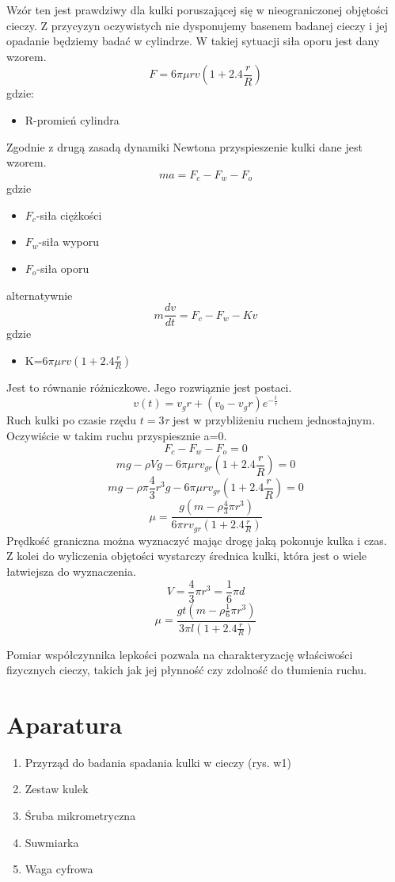 \documentclass{article}
\begin{document}
\vspace{0.5cm}
Wzór ten jest prawdziwy dla kulki poruszającej się w nieograniczonej objętości cieczy. Z przycyzyn oczywistych nie dysponujemy basenem badanej cieczy i jej opadanie będziemy badać w cylindrze. W takiej sytuacji siła oporu jest dany wzorem.
\[F=6\pi\mu rv(1+2.4\frac{r}{R})\]
gdzie:
\begin{itemize}
    \item R-promień cylindra
\end{itemize}
Zgodnie z drugą zasadą dynamiki Newtona przyspieszenie kulki dane jest wzorem.
\[ma=F_c-F_w-F_o\]
gdzie
\begin{itemize}
    \item $F_c$-siła ciężkości
    \item $F_w$-siła wyporu
    \item $F_o$-siła oporu
\end{itemize}
alternatywnie
\[m\frac{dv}{dt}=F_c-F_w-Kv\]
gdzie
\begin{itemize}
    \item K=$6\pi\mu rv(1+2.4\frac{r}{R})$
\end{itemize}
Jest to równanie różniczkowe. Jego rozwiąznie jest postaci.
\[v(t)=v_gr+(v_0-v_gr)e^{-\frac{t}{\tau}}\]
Ruch kulki po czasie rzędu $t=3\tau$ jest w przybliżeniu ruchem jednostajnym. Oczywiście w takim ruchu przyspiesznie a=0.
\[F_c-F_w-F_o=0\]
\[mg-\rho Vg-6\pi\mu rv_{gr}(1+2.4\frac{r}{R})=0\]
\[mg-\rho\pi\frac{4}{3}r^3g-6\pi\mu rv_{gr}(1+2.4\frac{r}{R})=0\]
\[\mu=\frac{g(m-\rho\frac{4}{3}\pi r^3)}{6\pi rv_{gr}(1+2.4\frac{r}{R})}\]
Prędkość graniczna można wyznaczyć mając drogę jaką pokonuje kulka i czas.\\
Z kolei do wyliczenia objętości wystarczy średnica kulki, która jest o wiele łatwiejsza do wyznaczenia.
\[V=\frac{4}{3}\pi r^3=\frac{1}{6}\pi d\]
\[\mu=\frac{gt(m-\rho\frac{1}{6}\pi r^3)}{3\pi l(1+2.4\frac{r}{R})}\]

Pomiar współczynnika lepkości pozwala na charakteryzację właściwości fizycznych cieczy, takich jak jej płynność czy zdolność do tłumienia ruchu.


\section{Aparatura}

\begin{enumerate}
    \item Przyrząd do badania spadania kulki w cieczy (rys. w1)
    \item Zestaw kulek
    \item Śruba mikrometryczna
    \item Suwmiarka
    \item Waga cyfrowa
\end{enumerate}
\end{document}
